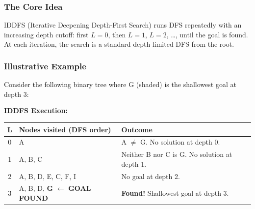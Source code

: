 \documentclass[12pt, a4paper]{article}
\newcommand{\node}[1]{\textbf{#1}}
\newcommand{\goal}{\textcolor{green!55!black}{\textbf{GOAL FOUND}}}
\begin{document}
\subsubsection*{The Core Idea}

IDDFS (Iterative Deepening Depth-First Search) runs DFS repeatedly with an increasing depth cutoff: first $L{=}0$, then $L{=}1$, $L{=}2$, \ldots, until the goal is found. At each iteration, the search is a standard depth-limited DFS from the root.

\subsubsection*{Illustrative Example}

Consider the following binary tree where G (shaded) is the shallowest goal at depth 3:

\begin{center}
\end{center}

\vspace{0.4em}

\noindent\textbf{IDDFS Execution:}

\begin{center}
\renewcommand{\arraystretch}{1.2}
\small
\begin{tabular}{c|l|p{9cm}}
\toprule
\textbf{L} & \textbf{Nodes visited (DFS order)} & \textbf{Outcome} \\
\midrule
0 & A & A $\neq$ G. No solution at depth 0. \\
1 & A, B, C & Neither B nor C is G. No solution at depth 1. \\
2 & A, B, D, E, C, F, I & No goal at depth 2. \\
3 & A, B, D, \textbf{G} $\leftarrow$ \goal & \textbf{Found!} Shallowest goal at depth 3. \\
\bottomrule
\end{tabular}
\end{center}
\end{document}
